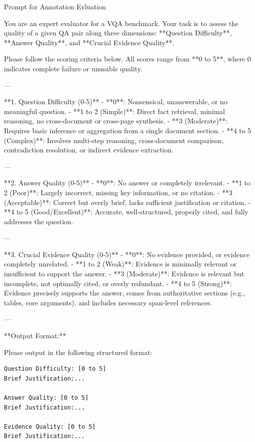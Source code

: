 \documentclass{llmxive}
\begin{document}
{{{\begin{promptbox}[breakable]{Prompt for Annotation Evluation}

You are an expert evaluator for a VQA benchmark. Your task is to assess the quality of a given QA pair along three dimensions: **Question Difficulty**, **Answer Quality**, and **Crucial Evidence Quality**.

Please follow the scoring criteria below. All scores range from **0 to 5**, where 0 indicates complete failure or unusable quality.

---

**1. Question Difficulty (0-5)**
- **0**: Nonsensical, unanswerable, or no meaningful question.
- **1 to 2 (Simple)**: Direct fact retrieval, minimal reasoning, no cross-document or cross-page synthesis.
- **3 (Moderate)**: Requires basic inference or aggregation from a single document section.
- **4 to 5 (Complex)**: Involves multi-step reasoning, cross-document comparison, contradiction resolution, or indirect evidence extraction.

---

**2. Answer Quality (0-5)**
- **0**: No answer or completely irrelevant.
- **1 to 2 (Poor)**: Largely incorrect, missing key information, or no citation.
- **3 (Acceptable)**: Correct but overly brief, lacks sufficient justification or citation.
- **4 to 5 (Good/Excellent)**: Accurate, well-structured, properly cited, and fully addresses the question.

---

**3. Crucial Evidence Quality (0-5)**
- **0**: No evidence provided, or evidence completely unrelated.
- **1 to 2 (Weak)**: Evidence is minimally relevant or insufficient to support the answer.
- **3 (Moderate)**: Evidence is relevant but incomplete, not optimally cited, or overly redundant.
- **4 to 5 (Strong)**: Evidence precisely supports the answer, comes from authoritative sections (e.g., tables, core arguments), and includes necessary span-level references.

---

**Output Format:**

Please output in the following structured format:

\begin{lstlisting}
Question Difficulty: [0 to 5]
Brief Justification:...

Answer Quality: [0 to 5]
Brief Justification:...

Evidence Quality: [0 to 5]
Brief Justification:...
\end{lstlisting}
\end{promptbox}



}}}
\end{document}
